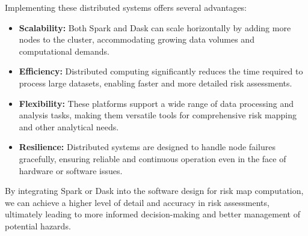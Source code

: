 \documentclass[12pt]{report}
\begin{document}
        Implementing these distributed systems offers several advantages:
        \begin{itemize}
          \item \textbf{Scalability:} Both Spark and Dask can scale horizontally by adding more nodes to the cluster,
          accommodating growing data volumes and computational demands.
          \item \textbf{Efficiency:} Distributed computing significantly reduces the time required to process large
          datasets, enabling faster and more detailed risk assessments.
          \item \textbf{Flexibility:} These platforms support a wide range of data processing and analysis tasks, making
          them versatile tools for comprehensive risk mapping and other analytical needs.
          \item \textbf{Resilience:} Distributed systems are designed to handle node failures gracefully, ensuring
          reliable and continuous operation even in the face of hardware or software issues.
        \end{itemize}
        
        By integrating Spark or Dask into the software design for risk map computation, we can achieve a higher level of
        detail and accuracy in risk assessments, ultimately leading to more informed decision-making and better
        management of potential hazards.


\printbibliography
\end{document}
